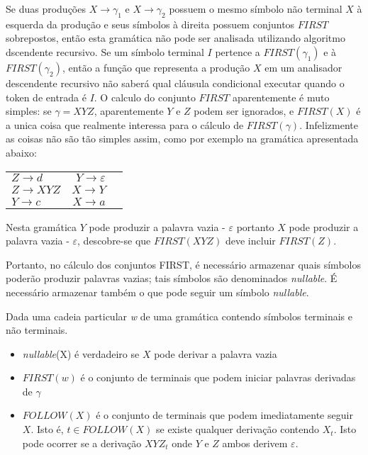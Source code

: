 \documentclass[10pt,a4paper,titlepage]{hitec}
\begin{document}
Se duas produções $X \rightarrow \gamma_1$ e $X \rightarrow \gamma_2$ possuem o mesmo símbolo não terminal $X$ à esquerda da produção e seus símbolos à direita possuem conjuntos $FIRST$ sobrepostos, então esta gramática não pode ser analisada utilizando algoritmo dscendente recursivo. 
Se um símbolo terminal $I$ pertence a $FIRST(\gamma_1)$ e à $FIRST(\gamma_2)$, então a função que representa a produção $X$ em um analisador descendente recursivo não saberá qual cláusula condicional executar quando o token de entrada é $I$.
O calculo do conjunto $FIRST$ aparentemente é muto simples: se $\gamma = XYZ$, aparentemente $Y$ e $Z$ podem ser ignorados, e $FIRST(X)$ é a unica coisa que realmente interessa para o cálculo de $FIRST(\gamma)$.
Infelizmente as coisas não são tão simples assim, como por exemplo na gramática apresentada abaixo:
\\
\begin{center}
\begin{tabular}{lrc}
$Z \rightarrow d$ & $Y \rightarrow \varepsilon$\\
$Z \rightarrow XYZ$ & $X \rightarrow Y $\\
$Y \rightarrow c$ & $X \rightarrow a$\\
\end{tabular}
\end{center}

Nesta gramática $Y$ pode produzir a palavra vazia - $\varepsilon$ portanto $X$ pode produzir a palavra vazia - $\varepsilon$, descobre-se que $FIRST(XYZ)$ deve incluir $FIRST(Z)$.

Portanto, no cálculo dos conjuntos FIRST, é necessário armazenar quais símbolos poderão produzir palavras vazias; tais símbolos são denominados \textit{nullable}.
É necessário armazenar também o que pode seguir um símbolo \textit{nullable}.

Dada uma cadeia particular \textit{w} de uma gramática contendo símbolos terminais e não terminais.

\begin{itemize}
\item \textit{nullable}(X) é verdadeiro se $X$ pode derivar a palavra vazia
\item $FIRST(w)$ é o conjunto de terminais que podem iniciar palavras derivadas de $\gamma$
\item $FOLLOW(X)$ é o conjunto de terminais que podem imediatamente seguir $X$. Isto é, $t \in FOLLOW(X)$ se existe qualquer derivação contendo $X_t$. Isto pode ocorrer se a derivação $XYZ_t$ onde $Y$ e $Z$ ambos derivem $\varepsilon$.
\end{itemize}
\end{document}
